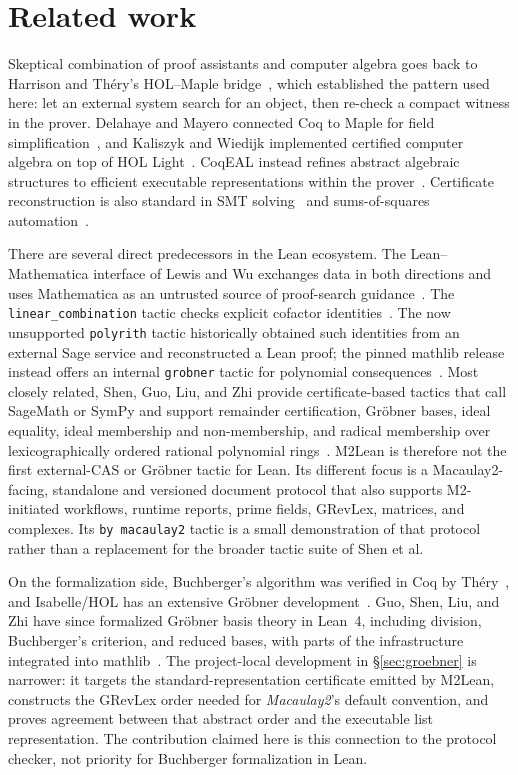 \documentclass[11pt]{article}
\newcommand{\M}{\textit{Macaulay2}}
\newcommand{\mathlib}{\textsf{mathlib}}
\newcommand{\code}[1]{\texttt{#1}}
\begin{document}
\section{Related work}\label{sec:related}

Skeptical combination of proof assistants and computer algebra goes
back to Harrison and Th\'ery's HOL--Maple bridge~\cite{harrison-thery},
which established the pattern used here: let an external system search
for an object, then re-check a compact witness in the prover.
Delahaye and Mayero connected Coq to Maple for field
simplification~\cite{delahaye-mayero}, and Kaliszyk and Wiedijk
implemented certified computer algebra on top of HOL
Light~\cite{kaliszyk-wiedijk}.  CoqEAL instead refines abstract
algebraic structures to efficient executable representations within
the prover~\cite{coqeal}.  Certificate reconstruction is also standard
in SMT solving~\cite{smt-certificates} and sums-of-squares
automation~\cite{harrison-sos}.

There are several direct predecessors in the Lean ecosystem.  The
Lean--Mathematica interface of Lewis and Wu exchanges data in both
directions and uses Mathematica as an untrusted source of proof-search
guidance~\cite{lewis-wu}.  The \code{linear\_combination} tactic checks
explicit cofactor identities~\cite{linear-combination}.  The now
unsupported \code{polyrith} tactic historically obtained such
identities from an external Sage service and reconstructed a Lean
proof; the pinned \mathlib{} release instead offers an internal
\code{grobner} tactic for polynomial consequences~\cite{polyrith}.
Most closely related, Shen, Guo, Liu, and Zhi provide certificate-based tactics that
call SageMath or SymPy and support remainder certification, Gr\"obner
bases, ideal equality, ideal membership and non-membership, and radical
membership over lexicographically ordered rational polynomial
rings~\cite{shen-polynomial-tactics}.  M2Lean is therefore not the
first external-CAS or Gr\"obner tactic for Lean.  Its different focus
is a Macaulay2-facing, standalone and versioned document protocol that
also supports M2-initiated workflows, runtime reports, prime fields,
GRevLex, matrices, and complexes.  Its \code{by macaulay2} tactic is a
small demonstration of that protocol rather than a replacement for
the broader tactic suite of Shen et al.

On the formalization side, Buchberger's algorithm was verified in Coq
by Th\'ery~\cite{thery-buchberger}, and Isabelle/HOL has an extensive
Gr\"obner development~\cite{divason-groebner}.  Guo, Shen, Liu, and
Zhi have since formalized Gr\"obner basis theory in Lean~4, including
division, Buchberger's criterion, and reduced bases, with parts of the
infrastructure integrated into \mathlib{}~\cite{guo-groebner-lean}.
The project-local development in \S\ref{sec:groebner} is narrower: it
targets the standard-representation certificate emitted by M2Lean,
constructs the GRevLex order needed for \M{}'s default convention, and
proves agreement between that abstract order and the executable list
representation.  The contribution claimed here is this connection to
the protocol checker, not priority for Buchberger formalization in
Lean.
\end{document}
